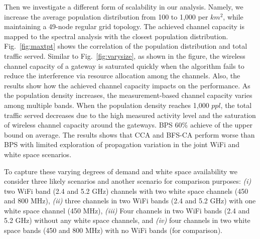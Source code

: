 Then we investigate a different form of scalability in our analysis.  Namely,
we increase the average population distribution from 100 to 1,000 per $km^2$, while
maintaining a 49-node regular grid topology. The achieved channel capacity is mapped 
to the spectral analysis with the closest population distribution. 
%
%
Fig.~\ref{fig:maxtpt} shows the correlation of the population distribution and total traffic served. 
Similar to Fig.~\ref{fig:varysize}, as shown in the figure, the wireless channel capacity of a 
gateway is saturated quickly when the algorithm fails to 
reduce the interference via resource allocation among the channels.
Also, the results show how the achieved channel capacity impacts on the performance. 
As the population density increases, the measurement-based channel capacity varies among multiple 
bands. When the population density reaches 1,000 $ppl$, the total traffic served decreases
due to the high measured activity level and the saturation of wireless channel capacity 
around the gateways. BPS 60\% achieve of the upper bound on average. 
The results shows that CCA and BFS-CA perform worse than BPS with limited exploration of 
propagation variation in the joint WiFi and white space scenarios.





To capture these varying degrees of demand 
and white space availability we consider three likely scenarios and another 
scenario for comparison purposes: {\it (i)} two WiFi band (2.4 and
5.2 GHz) channels with two white space channels (450 and 800 MHz), {\it (ii)} 
three channels in two WiFi bands (2.4 and 5.2 GHz) with one white space channel 
(450 MHz), {\it (iii)} Four channels in two WiFi bands (2.4 and 5.2 GHz) without 
any white space channels, and {\it (iv)} four channels in two white space bands 
(450 and 800 MHz) with no WiFi bands (for comparison).

